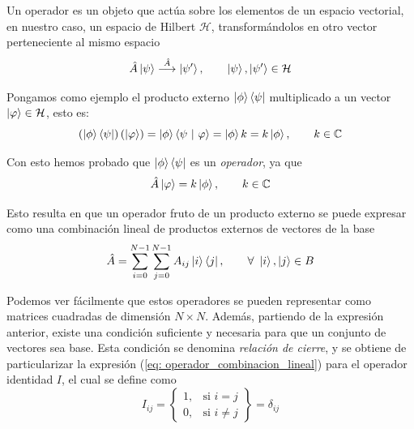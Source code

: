\documentclass[12pt]{article}
\numberwithin{equation}{section} %
\begin{document}
    \vspace{5mm}

    Un operador es un objeto que actúa sobre los elementos de un espacio vectorial, en nuestro caso, un espacio de Hilbert \( \mathcal{H} \), transformándolos en otro vector perteneciente al mismo espacio
    \begin{equation}
        \hat{A} \ket{\psi} \overset{\hat{A}}{\longrightarrow} \ket{\psi '}, \qquad \ket{\psi}, \ket{\psi '} \in \mathcal{H}
        \label{eq: operador_espacio_hilbert}
    \end{equation}

    \vspace{1.5mm}

    Pongamos como ejemplo el producto externo \( \ket{\phi} \bra{\psi} \) multiplicado a un vector \( \ket{\varphi} \in \mathcal{H} \), esto es:
    \begin{equation*}
        \left( \ket{\phi} \bra{\psi} \right) \left( \ket{\varphi} \right) = \ket{\phi} \braket{\psi \ | \ \varphi} = \ket{\phi} k = k \ket{\phi}, \qquad k \in \mathbb{C}
    \end{equation*}

    \vspace{1.5mm}

    Con esto hemos probado que \( \ket{\phi} \bra{\psi} \) es un \textit{operador}, ya que 
    \begin{equation}
        \hat{A} \ket\varphi = k \ket{\phi}, \qquad k \in \mathbb{C}
    \end{equation}

    \vspace{1.5mm}

    Esto resulta en que un operador fruto de un producto externo se puede expresar como una combinación lineal de productos externos de vectores de la base
    \begin{equation}
        \hat{A} = \sum_{i = 0}^{N - 1} \sum_{j = 0}^{N - 1} A_{ij} \ket{i} \bra{j}, \qquad \forall \ \ket{i}, \ket{j} \in B
        \label{eq: operador_combinacion_lineal}
    \end{equation}

    \vspace{1.5mm}

    Podemos ver fácilmente que estos operadores se pueden representar como matrices cuadradas de dimensión \( N \times N \). Además, partiendo de la expresión anterior, existe una condición suficiente y necesaria para que un conjunto de vectores sea base. Esta condición se denomina \textit{relación de cierre}, y se obtiene de particularizar la expresión (\ref{eq: operador_combinacion_lineal}) para el operador identidad \( I \), el cual se define como 
    \begin{equation}
        I_{ij} =
        \left\{
        \begin{array}{ll}
            1, & \text{si } i = j \\
            0, & \text{si } i \neq j
        \end{array}
        \right\}
        = \delta_{ij}
    \end{equation}
\end{document}
